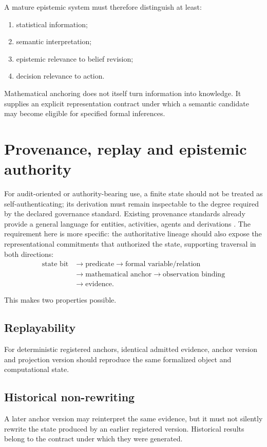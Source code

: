 \documentclass[11pt,a4paper]{article}
\begin{document}
A mature epistemic system must therefore distinguish at least:
\begin{enumerate}
    \item statistical information;
    \item semantic interpretation;
    \item epistemic relevance to belief revision;
    \item decision relevance to action.
\end{enumerate}

Mathematical anchoring does not itself turn information into knowledge. It supplies an explicit representation contract under which a semantic candidate may become eligible for specified formal inferences.

\section{Provenance, replay and epistemic authority}
For audit-oriented or authority-bearing use, a finite state should not be treated as self-authenticating; its derivation must remain inspectable to the degree required by the declared governance standard. Existing provenance standards already provide a general language for entities, activities, agents and derivations \cite{w3cProv2013}. The requirement here is more specific: the authoritative lineage should also expose the representational commitments that authorized the state, supporting traversal in both directions:
\begin{align}
\text{state bit} &\rightarrow \text{predicate} \rightarrow \text{formal variable/relation} \\
&\rightarrow \text{mathematical anchor} \rightarrow \text{observation binding} \\
&\rightarrow \text{evidence}.
\end{align}

This makes two properties possible.

\subsection{Replayability}
For deterministic registered anchors, identical admitted evidence, anchor version and projection version should reproduce the same formalized object and computational state.

\subsection{Historical non-rewriting}
A later anchor version may reinterpret the same evidence, but it must not silently rewrite the state produced by an earlier registered version. Historical results belong to the contract under which they were generated.
\end{document}
